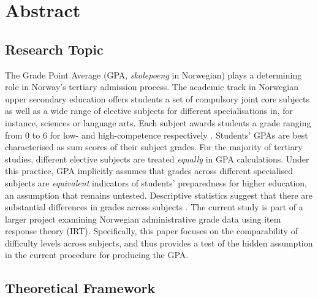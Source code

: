 \section{Abstract}


\subsection{Research Topic}



The Grade Point Average (GPA, \textit{skolepoeng} in Norwegian) plays a determining role in Norway's tertiary admission process. The academic track in Norwegian upper secondary education offers students a set of compulsory joint core subjects as well as a wide range of elective subjects for different specialisations in, for instance, sciences or language arts. Each subject awards students a grade ranging from $0$ to $6$ for low- and high-competence respectively \parencite[][\S 3-5]{lovdata:2006}. Students' GPAs are best characterised as sum scores of their subject grades. For the majority of tertiary studies, different elective subjects are treated \emph{equally} in GPA calculations. Under this practice, GPA implicitly assumes that grades across different specialised subjects are \emph{equivalent} indicators of students' preparedness for higher education, an assumption that remains untested. Descriptive statistics suggest that there are substantial differences in grades across subjects \parencite{udir:2022}. The current study is part of a larger project examining Norwegian administrative grade data using item response theory (IRT). Specifically, this paper focuses on the comparability of difficulty levels across subjects, and thus provides a test of the hidden assumption in the current procedure for producing the GPA.

\subsection{Theoretical Framework}

